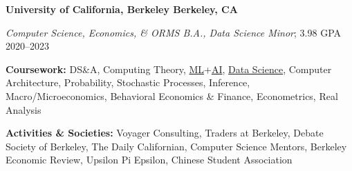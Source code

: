 \textbf{University of California, Berkeley \hfill Berkeley, CA} \par
\textit{Computer Science, Economics, \& ORMS B.A., Data Science Minor}; 3.98 GPA \hfill 2020--2023\par
\textbf{Coursework:} DS\&A, Computing Theory, \href{https://www.eecs189.org/}{ML}+\href{https://inst.eecs.berkeley.edu/~cs188/fa22/}{AI}, \href{https://ds100.org/}{Data Science},  Computer Architecture, Probability, Stochastic Processes, Inference, Macro/Microeconomics, Behavioral Economics
\& Finance, Econometrics, Real Analysis \par
\textbf{Activities \& Societies:} Voyager Consulting, Traders at Berkeley, Debate Society of Berkeley, The Daily Californian, Computer Science Mentors, Berkeley Economic Review, Upsilon Pi Epsilon, Chinese Student Association